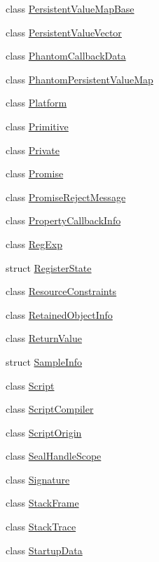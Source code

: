 \begin{DoxyCompactItemize}
\item 
class \hyperlink{classv8_1_1_persistent_value_map_base}{Persistent\+Value\+Map\+Base}
\item 
class \hyperlink{classv8_1_1_persistent_value_vector}{Persistent\+Value\+Vector}
\item 
class \hyperlink{classv8_1_1_phantom_callback_data}{Phantom\+Callback\+Data}
\item 
class \hyperlink{classv8_1_1_phantom_persistent_value_map}{Phantom\+Persistent\+Value\+Map}
\item 
class \hyperlink{classv8_1_1_platform}{Platform}
\item 
class \hyperlink{classv8_1_1_primitive}{Primitive}
\item 
class \hyperlink{classv8_1_1_private}{Private}
\item 
class \hyperlink{classv8_1_1_promise}{Promise}
\item 
class \hyperlink{classv8_1_1_promise_reject_message}{Promise\+Reject\+Message}
\item 
class \hyperlink{classv8_1_1_property_callback_info}{Property\+Callback\+Info}
\item 
class \hyperlink{classv8_1_1_reg_exp}{Reg\+Exp}
\item 
struct \hyperlink{structv8_1_1_register_state}{Register\+State}
\item 
class \hyperlink{classv8_1_1_resource_constraints}{Resource\+Constraints}
\item 
class \hyperlink{classv8_1_1_retained_object_info}{Retained\+Object\+Info}
\item 
class \hyperlink{classv8_1_1_return_value}{Return\+Value}
\item 
struct \hyperlink{structv8_1_1_sample_info}{Sample\+Info}
\item 
class \hyperlink{classv8_1_1_script}{Script}
\item 
class \hyperlink{classv8_1_1_script_compiler}{Script\+Compiler}
\item 
class \hyperlink{classv8_1_1_script_origin}{Script\+Origin}
\item 
class \hyperlink{classv8_1_1_seal_handle_scope}{Seal\+Handle\+Scope}
\item 
class \hyperlink{classv8_1_1_signature}{Signature}
\item 
class \hyperlink{classv8_1_1_stack_frame}{Stack\+Frame}
\item 
class \hyperlink{classv8_1_1_stack_trace}{Stack\+Trace}
\item 
class \hyperlink{classv8_1_1_startup_data}{Startup\+Data}

\end{DoxyCompactItemize}
